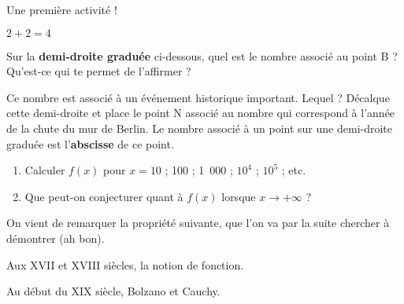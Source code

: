 \begin{activite}

Une première activité !

$2+2=4$

Sur la \textbf{demi-droite graduée} ci-dessous, quel est le nombre associé au point B ? Qu'est-ce qui te permet de l'affirmer ?

Ce nombre est associé à un événement historique important. Lequel ?
Décalque cette demi-droite et place le point N associé au nombre qui correspond à l'année de la chute du mur de Berlin.
Le nombre associé à un point sur une demi-droite graduée est l'\textbf{abscisse} de ce point.


\begin{partie}
\vspace{-1.5em}
\begin{enumerate}
 \item Calculer $f(x)$ pour $x = 10$ ; 100 ; 1~000 ; $10^{4}$ ; $10^{5}$ ; etc.
 \item Que peut-on conjecturer quant à $f(x)$ lorsque $x \to +\infty$ ?
 \end{enumerate}
\end{partie}

\begin{partie}
On vient de remarquer la propriété suivante, que l'on va par la suite chercher à démontrer (ah bon).
\end{partie}
\vspace{-4em}
\end{activite}





\begin{activite}

\begin{partie}[partie 1]
Aux XVII et XVIII siècles, la notion de fonction. 
\end{partie}

\begin{partie}[Partie 2]
Au début du XIX siècle, Bolzano et Cauchy.\end{partie}
\vspace{-4em}
\end{activite}


\pagebreak
\vspace*{-1cm}

